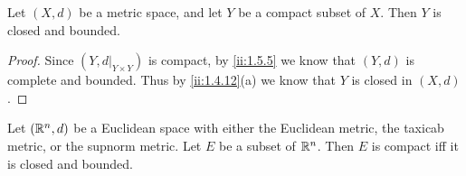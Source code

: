 \begin{cor}\label{ii:1.5.6}
  Let \((X, d)\) be a metric space, and let \(Y\) be a compact subset of \(X\).
  Then \(Y\) is closed and bounded.
\end{cor}

\begin{proof}
  Since \((Y, d|_{Y \times Y})\) is compact, by \cref{ii:1.5.5} we know that \((Y, d)\) is complete and bounded.
  Thus by \cref{ii:1.4.12}(a) we know that \(Y\) is closed in \((X, d)\).
\end{proof}

\begin{thm}\label{ii:1.5.7}
  Let \((\mathbb{R}^n, d)\) be a Euclidean space with either the Euclidean metric, the taxicab metric, or the supnorm metric.
  Let \(E\) be a subset of \(\mathbb{R}^n\).
  Then \(E\) is compact iff it is closed and bounded.
\end{thm}

